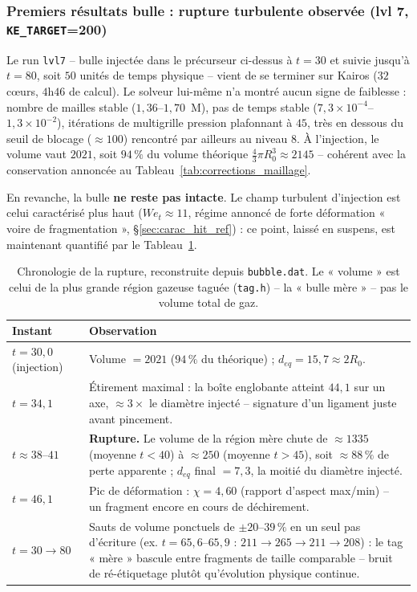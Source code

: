 \subsubsection{Premiers résultats bulle : rupture turbulente observée (lvl 7, \texttt{KE\_TARGET}=200)}
\label{sec:resultats_lvl7}

Le run \texttt{lvl7} -- bulle injectée dans le précurseur ci-dessus à $t=30$ et suivie
jusqu'à $t=80$, soit $50$ unités de temps physique -- vient de se terminer sur Kairos
($32$ cœurs, $4$h$46$ de calcul). Le solveur lui-même n'a montré aucun signe de
faiblesse : nombre de mailles stable ($1{,}36$--$1{,}70$~M), pas de temps stable
($7{,}3\times10^{-4}$--$1{,}3\times10^{-2}$), itérations de multigrille pression
plafonnant à $45$, très en dessous du seuil de blocage ($\approx 100$) rencontré par
ailleurs au niveau 8. À l'injection, le volume vaut $2021$, soit $94\,\%$ du volume
théorique $\frac{4}{3}\pi R_0^3 \approx 2145$ -- cohérent avec la conservation
annoncée au Tableau~\ref{tab:corrections_maillage}.

En revanche, la bulle \textbf{ne reste pas intacte}. Le champ turbulent d'injection
est celui caractérisé plus haut ($We_t \approx 11$, régime annoncé de forte
déformation « voire de fragmentation », \S\ref{sec:carac_hit_ref}) : ce point,
laissé en suspens, est maintenant quantifié par le Tableau~\ref{tab:rupture_lvl7}.

\begin{table}[H]
    \centering
    \caption{Chronologie de la rupture, reconstruite depuis \texttt{bubble.dat}. Le
    « volume » est celui de la plus grande région gazeuse taguée
    (\texttt{tag.h}) -- la « bulle mère » -- pas le volume total de gaz.}
    \label{tab:rupture_lvl7}
    \begin{tabular}{@{}lp{9.7cm}@{}}
        \toprule
        \textbf{Instant} & \textbf{Observation} \\
        \midrule
        $t=30{,}0$ (injection) & Volume $=2021$ ($94\,\%$ du théorique) ; $d_{eq}=15{,}7 \approx 2R_0$. \\
        $t=34{,}1$ & Étirement maximal : la boîte englobante atteint $44{,}1$ sur un axe,
        $\approx 3\times$ le diamètre injecté -- signature d'un ligament juste avant
        pincement. \\
        $t\approx 38$--$41$ & \textbf{Rupture.} Le volume de la région mère chute de
        $\approx 1335$ (moyenne $t<40$) à $\approx 250$ (moyenne $t>45$), soit
        $\approx 88\,\%$ de perte apparente ; $d_{eq}$ final $=7{,}3$, la moitié du
        diamètre injecté. \\
        $t=46{,}1$ & Pic de déformation : $\chi = 4{,}60$ (rapport d'aspect max/min) --
        un fragment encore en cours de déchirement. \\
        $t=30 \to 80$ & Sauts de volume ponctuels de $\pm20$--$39\,\%$ en un seul pas
        d'écriture (ex. $t=65{,}6$--$65{,}9$ : $211\to265\to211\to208$) : le tag
        « mère » bascule entre fragments de taille comparable -- bruit de
        ré-étiquetage plutôt qu'évolution physique continue. \\
        \bottomrule
    \end{tabular}
\end{table}

